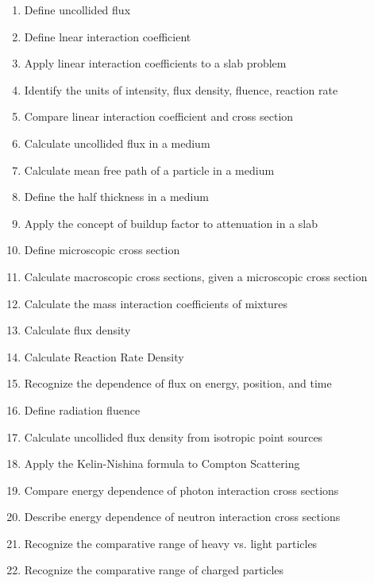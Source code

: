 \documentclass{article}
\begin{document}
\begin{enumerate}
	\item{Define uncollided flux}\\
	\item{Define lnear interaction coefficient}\\
	\item{Apply linear interaction coefficients to a slab problem}\\
	\item{Identify the units of intensity, flux density, fluence, reaction rate}\\
	\item{Compare linear interaction coefficient and cross section}\\
	\item{Calculate uncollided flux in a medium}\\
	\item{Calculate mean free path of a particle in a medium}\\
	\item{Define the half thickness in a medium}\\
	\item{Apply the concept of buildup factor to attenuation in a slab}\\
	\item{Define microscopic cross section}\\
	\item{Calculate macroscopic cross sections, given a microscopic cross section}\\
	\item{Calculate the mass interaction coefficients of mixtures}\\
	\item{Calculate flux density}\\
	\item{Calculate Reaction Rate Density}\\
	\item{Recognize the dependence of flux on energy, position, and time}\\
	\item{Define radiation fluence}\\
	\item{Calculate uncollided flux density from isotropic point sources}\\
	\item{Apply the Kelin-Nishina formula to Compton Scattering}\\
	\item{Compare energy dependence of photon interaction cross sections}\\
	\item{Describe energy dependence of neutron interaction cross sections}\\
	\item{Recognize the comparative range of heavy vs. light particles}\\
	\item{Recognize the comparative range of charged particles}\\
\end{enumerate}
\end{document}
